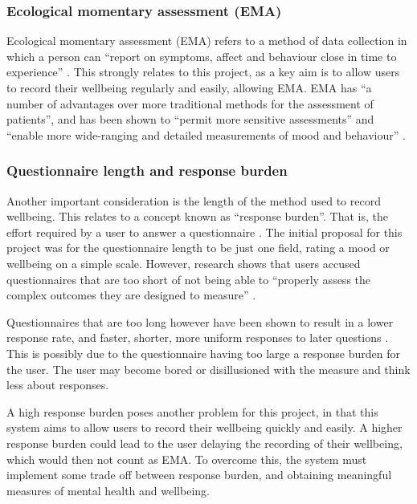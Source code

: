 \documentclass[11pt,openright,a4paper]{report}
\begin{document}
\subsubsection{Ecological momentary assessment (EMA)}
Ecological momentary assessment (EMA) refers to a method of data collection in which a person can \enquote{report on symptoms, affect and behaviour close in time to experience} \parencite{moskowitz2006ecological}. This strongly relates to this project, as a key aim is to allow users to record their wellbeing regularly and easily, allowing EMA. EMA has \enquote{a number of advantages over more traditional methods for the assessment of patients}, and has been shown to \enquote{permit more sensitive assessments} and \enquote{enable more wide-ranging and detailed measurements of mood and behaviour} \parencite{moskowitz2006ecological}.

\subsubsection{Questionnaire length and response burden} \label{questionnairelength}
Another important consideration is the length of the method used to record wellbeing. This relates to a concept known as \enquote{response burden}. That is, the effort required by a user to answer a questionnaire \parencite{rolstad2011response}. The initial proposal for this project was for the questionnaire length to be just one field, rating a mood or wellbeing on a simple scale. However, research shows that users accused questionnaires that are too short of not being able to \enquote{properly assess the complex
outcomes they are designed to measure} \parencite{crawford2011selecting}.

Questionnaires that are too long however have been shown to result in a lower response rate, and faster, shorter, more uniform responses to later questions \parencite{galesic2009effects}. This is possibly due to the questionnaire having too large a response burden for the user. The user may become bored or disillusioned with the measure and think less about responses.

A high response burden poses another problem for this project, in that this system aims to allow users to record their wellbeing quickly and easily. A higher response burden could lead to the user delaying the recording of their wellbeing, which would then not count as EMA. To overcome this, the system must implement some trade off between response burden, and obtaining meaningful measures of mental health and wellbeing.
\end{document}
